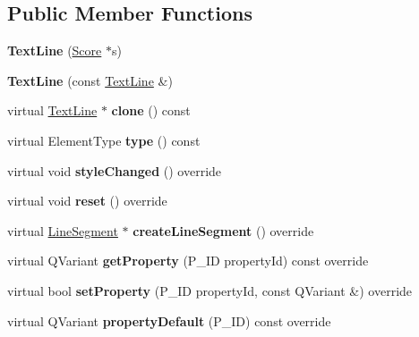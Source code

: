 \subsection*{Public Member Functions}
\begin{DoxyCompactItemize}
\item 
\mbox{\label{class_ms_1_1_text_line_a8f4aecb2a6dc83c3ecb2280d1998013c}} 
{\bfseries Text\+Line} (\hyperlink{class_ms_1_1_score}{Score} $\ast$s)
\item 
\mbox{\label{class_ms_1_1_text_line_a3cca140b3a66a3fb7184e663ec9ce90b}} 
{\bfseries Text\+Line} (const \hyperlink{class_ms_1_1_text_line}{Text\+Line} \&)
\item 
\mbox{\label{class_ms_1_1_text_line_a556e437692e86c31dd0b90e9465b27d0}} 
virtual \hyperlink{class_ms_1_1_text_line}{Text\+Line} $\ast$ {\bfseries clone} () const
\item 
\mbox{\label{class_ms_1_1_text_line_a1a91ef765d7120874488b12e3618218a}} 
virtual Element\+Type {\bfseries type} () const
\item 
\mbox{\label{class_ms_1_1_text_line_a75c72bb6e9f74f7be62ed36790bfeb73}} 
virtual void {\bfseries style\+Changed} () override
\item 
\mbox{\label{class_ms_1_1_text_line_a0f4aa871519d8ac98b28e86f1340d720}} 
virtual void {\bfseries reset} () override
\item 
\mbox{\label{class_ms_1_1_text_line_a15fd178b417af317481699acc9565457}} 
virtual \hyperlink{class_ms_1_1_line_segment}{Line\+Segment} $\ast$ {\bfseries create\+Line\+Segment} () override
\item 
\mbox{\label{class_ms_1_1_text_line_a23cc835faedf5d533c903a015f84bbe8}} 
virtual Q\+Variant {\bfseries get\+Property} (P\+\_\+\+ID property\+Id) const override
\item 
\mbox{\label{class_ms_1_1_text_line_a4afb083321ce837c0827ca022e606ac1}} 
virtual bool {\bfseries set\+Property} (P\+\_\+\+ID property\+Id, const Q\+Variant \&) override
\item 
\mbox{\label{class_ms_1_1_text_line_a0c49ea9684c7650cc17cc6c074b8dc49}} 
virtual Q\+Variant {\bfseries property\+Default} (P\+\_\+\+ID) const override
\end{DoxyCompactItemize}
